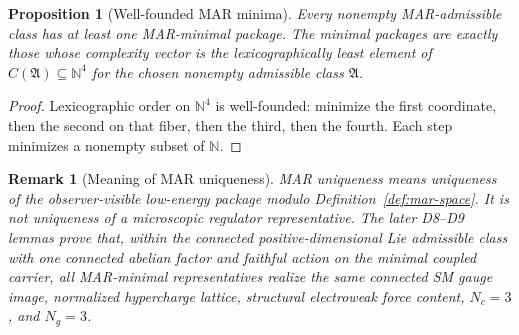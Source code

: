 \documentclass[11pt]{article}
\newtheorem{proposition}[theorem]{Proposition}
\newtheorem{remark}[theorem]{Remark}
\begin{document}
\begin{proposition}[Well-founded MAR minima]\label{prop:mar-well-founded}
Every nonempty MAR-admissible class has at least one MAR-minimal package. The minimal packages are exactly those whose complexity vector is the lexicographically least element of \(C(\mathfrak A)\subseteq\mathbb N^4\) for the chosen nonempty admissible class \(\mathfrak A\).
\end{proposition}

\begin{proof}
Lexicographic order on \(\mathbb N^4\) is well-founded: minimize the first coordinate, then the second on that fiber, then the third, then the fourth. Each step minimizes a nonempty subset of \(\mathbb N\).
\end{proof}

\begin{remark}[Meaning of MAR uniqueness]\label{rem:mar-uniqueness}
MAR uniqueness means uniqueness of the observer-visible low-energy package modulo Definition~\ref{def:mar-space}. It is not uniqueness of a microscopic regulator representative. The later D8--D9 lemmas prove that, within the connected positive-dimensional Lie admissible class with one connected abelian factor and faithful action on the minimal coupled carrier, all MAR-minimal representatives realize the same connected SM gauge image, normalized hypercharge lattice, structural electroweak force content, \(N_c=3\), and \(N_g=3\).
\end{remark}
\end{document}
